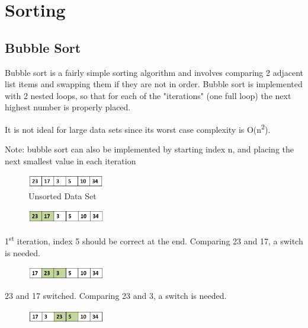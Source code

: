 
\chapter{Sorting}
\section{Bubble Sort}
Bubble sort is a fairly simple sorting algorithm and involves comparing 2 adjacent list items and swapping them if they are not in order. Bubble sort is implemented with 2 nested loops, so that for each of the "iterations" (one full loop) the next highest number is properly placed. \newline

It is not ideal for large data sets since its worst case complexity is O(n\textsuperscript{2}).\newline

Note: bubble sort can also be implemented by starting index n, and placing the next smallest value in each iteration

\begin{figure}[H]
\centering
\includegraphics[width=0.3\textwidth]{pictures/bubble1.png}
\caption{Unsorted Data Set}
\label{fig:bubble1}
\end{figure}

\begin{figure}[H]
\centering
\includegraphics[width=0.3\textwidth]{pictures/bubble2.png}
\label{fig:bubble2}
\end{figure}

1\textsuperscript{st} iteration, index 5 should be correct at the end.
Comparing 23 and 17, a switch is needed.

\begin{figure}[H]
\centering
\includegraphics[width=0.3\textwidth]{pictures/bubble3.png}
\label{fig:bubble3}
\end{figure}

23 and 17 switched. Comparing 23 and 3, a switch is needed.

\begin{figure}[H]
\centering
\includegraphics[width=0.3\textwidth]{pictures/bubble4.png}
\label{fig:bubble4}
\end{figure}

